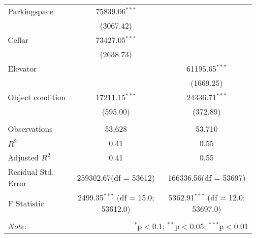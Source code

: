 \begin{table}[!htbp]
\begin{tabular}{@{\extracolsep{5pt}}lcc}
 Parkingspace & 75839.06$^{***}$ & \\
  & (3067.42) & \\
 Cellar & 73427.05$^{***}$ & \\
  & (2638.73) & \\
 Elevator & & 61195.65$^{***}$ \\
  & & (1669.25) \\
 Object condition & 17211.15$^{***}$ & 24336.71$^{***}$ \\
  & (595.00) & (372.89) \\
\hline \\[-1.8ex]
 Observations & 53,628 & 53,710 \\
 $R^2$ & 0.41 & 0.55 \\
 Adjusted $R^2$ & 0.41 & 0.55 \\
 Residual Std. Error & 259302.67(df = 53612) & 166336.56(df = 53697)  \\
 F Statistic & 2499.35$^{***}$ (df = 15.0; 53612.0) & 5362.91$^{***}$ (df = 12.0; 53697.0) \\
\hline
\hline \\[-1.8ex]
\textit{Note:} & \multicolumn{2}{r}{$^{*}$p$<$0.1; $^{**}$p$<$0.05; $^{***}$p$<$0.01} \\
\end{tabular}
\end{table}